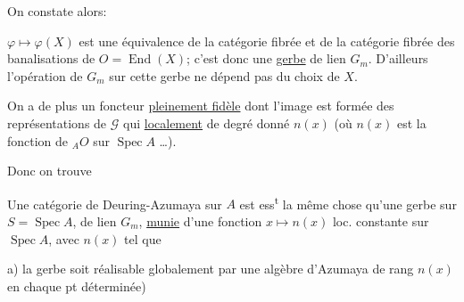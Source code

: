On constate alors:   

 $\varphi\longmapsto\varphi(X)$ est une équivalence de la catégorie fibrée   et de la catégorie fibrée des banalisations de $O=\operatorname{End}(X)$; c'est donc une \uline{gerbe} de lien $G_m$. D'ailleurs l'opération de $G_m$ sur cette gerbe ne dépend pas du choix de $X$.

On a de plus un foncteur \uline{pleinement fidèle}
dont l'image est formée des représentations de $\mathcal G$ qui  \uline{localement}  de degré donné $n(x)$ (où $n(x)$ est la fonction  de ${}_A O$ sur $\operatorname{Spec}A$ \ldots).

Donc on trouve

Une catégorie de Deuring-Azumaya sur $A$ est ess\textsuperscript{t} la même chose qu'une gerbe sur $S=\operatorname{Spec}A$, de lien $G_m$, \uline{munie} d'une fonction $x\longmapsto n(x)$ loc. constante sur $\operatorname{Spec}A$, avec  $n(x)$ tel que

a) la gerbe soit  réalisable globalement par une algèbre d'Azumaya de rang $n(x)$  en chaque pt  déterminée)


